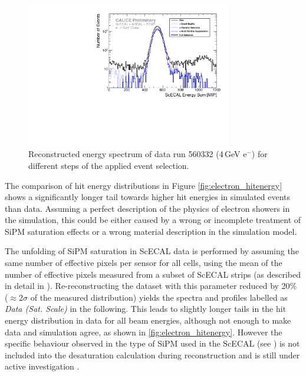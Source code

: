 \documentclass[twoside,a4paper,12pt]{article}
\newcommand\eminus{\(\mathrm{e^-}\)}
\begin{document}
\begin{figure}[htbp]
\begin{center}
\includegraphics[width=0.8\textwidth]{fig/electron/ERec_cutFlow_560332_data.pdf}
\caption{Reconstructed energy spectrum of data run 560332 (4\,GeV \eminus) for different steps of the applied event selection.}
\label{fig:cutflow_electron}
\end{center}
\end{figure}

The comparison of hit energy distributions in Figure \ref{fig:electron_hitenergy} shows a significantly longer tail towards higher hit energies in simulated events than data. Assuming a perfect description of the physics of electron showers in the simulation, this could be either caused by a wrong or incomplete treatment of SiPM saturation effects or a wrong material description in the simulation model.

The unfolding of SiPM saturation in ScECAL data is performed by assuming the same number of effective pixels per sensor for all cells, using the mean of the number of effective pixels measured from a subset of ScECAL strips (as described in detail in \cite{CAN16b}). Re-reconstructing the dataset with this parameter reduced by 20\% ($\approx 2\sigma$ of the measured distribution) yields the spectra and profiles labelled as \emph{Data (Sat. Scale)} in the following. This leads to slightly longer tails in the hit energy distribution in data for all beam energies, although not enough to make data and simulation agree, as shown in \autoref{fig:electron_hitenergy}. However the specific behaviour observed in the type of SiPM used in the ScECAL (see \cite{CAN16b}) is not included into the desaturation calculation during reconstruction and is still under active investigation \cite{SiPMNLO}.
\end{document}
